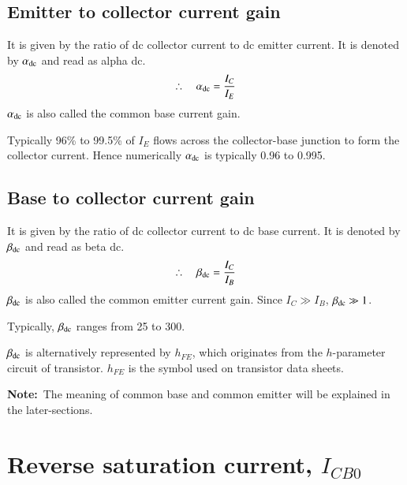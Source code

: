 \subsection{Emitter to collector current gain}\label{sec3.8.1}

It is given by the ratio of dc collector current to dc emitter current. It is denoted by $\alpha_{\operatorname{dc}}$ and read as alpha dc.
\begin{equation}
\therefore\quad \alpha_{\operatorname{dc}}=\dfrac{I_{C}}{I_{E}}\label{eq3.3}
\end{equation}
$\alpha_{\operatorname{dc}}$ is also called the common base current gain.

Typically 96\% to 99.5\% of $I_{E}$ flows across the collector-base junction to form the collector current. Hence numerically $\alpha_{\operatorname{dc}}$ is typically 0.96 to 0.995.

\subsection{Base to collector current gain}\label{sec3.8.2}

It is given by the ratio of dc collector current to dc base current. It is denoted by $\beta_{\operatorname{dc}}$ and read as beta dc.
\begin{equation}
\therefore\quad \beta_{\operatorname{dc}}=\dfrac{I_{C}}{I_{B}}\label{eq3.4}
\end{equation}
$\beta_{\operatorname{dc}}$ is also called the common emitter current gain. Since $I_{C}\gg I_{B}$, $\beta_{\operatorname{dc}}\gg 1$.

Typically, $\beta_{\operatorname{dc}}$ ranges from 25 to 300.

$\beta_{\operatorname{dc}}$ is alternatively represented by $h_{FE}$, which originates from the $h$-parameter circuit of transistor. $h_{FE}$ is the symbol used on transistor data sheets.

\smallskip
\noindent
{\bf Note:}~The meaning of common base and common emitter will be explained in the later-sections.

\section[Reverse saturation current, $I_{CB0}$]{Reverse saturation current, \boldmath$I_{CB0}$}\label{sec3.9}

